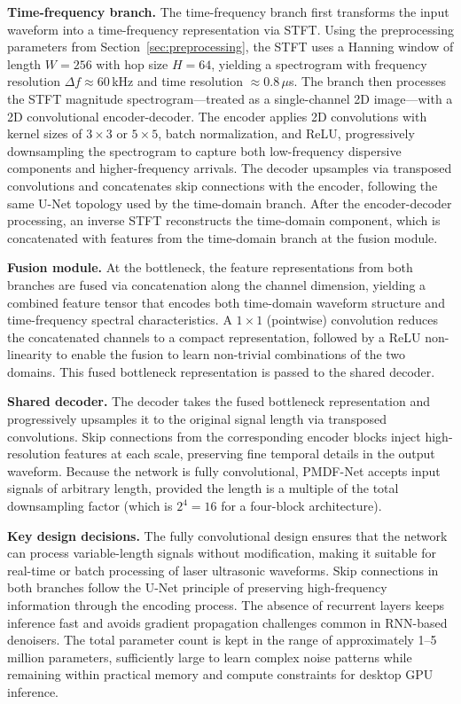 \textbf{Time-frequency branch.} The time-frequency branch first transforms the input waveform into a time-frequency representation via STFT. Using the preprocessing parameters from Section~\ref{sec:preprocessing}, the STFT uses a Hanning window of length $W = 256$ with hop size $H = 64$, yielding a spectrogram with frequency resolution $\Delta f \approx 60$\,kHz and time resolution $\approx 0.8$\,$\mu$s. The branch then processes the STFT magnitude spectrogram---treated as a single-channel 2D image---with a 2D convolutional encoder-decoder. The encoder applies 2D convolutions with kernel sizes of $3 \times 3$ or $5 \times 5$, batch normalization, and ReLU, progressively downsampling the spectrogram to capture both low-frequency dispersive components and higher-frequency arrivals. The decoder upsamples via transposed convolutions and concatenates skip connections with the encoder, following the same U-Net topology used by the time-domain branch. After the encoder-decoder processing, an inverse STFT reconstructs the time-domain component, which is concatenated with features from the time-domain branch at the fusion module.

\textbf{Fusion module.} At the bottleneck, the feature representations from both branches are fused via concatenation along the channel dimension, yielding a combined feature tensor that encodes both time-domain waveform structure and time-frequency spectral characteristics. A $1 \times 1$ (pointwise) convolution reduces the concatenated channels to a compact representation, followed by a ReLU non-linearity to enable the fusion to learn non-trivial combinations of the two domains. This fused bottleneck representation is passed to the shared decoder.

\textbf{Shared decoder.} The decoder takes the fused bottleneck representation and progressively upsamples it to the original signal length via transposed convolutions. Skip connections from the corresponding encoder blocks inject high-resolution features at each scale, preserving fine temporal details in the output waveform. Because the network is fully convolutional, PMDF-Net accepts input signals of arbitrary length, provided the length is a multiple of the total downsampling factor (which is $2^4 = 16$ for a four-block architecture).

\textbf{Key design decisions.} The fully convolutional design ensures that the network can process variable-length signals without modification, making it suitable for real-time or batch processing of laser ultrasonic waveforms. Skip connections in both branches follow the U-Net principle of preserving high-frequency information through the encoding process. The absence of recurrent layers keeps inference fast and avoids gradient propagation challenges common in RNN-based denoisers. The total parameter count is kept in the range of approximately 1--5 million parameters, sufficiently large to learn complex noise patterns while remaining within practical memory and compute constraints for desktop GPU inference.

